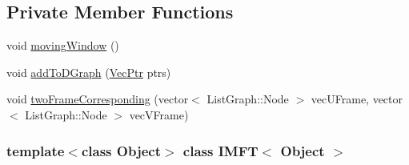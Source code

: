 \subsection*{\-Private \-Member \-Functions}
\begin{DoxyCompactItemize}
\item 
void \hyperlink{class_i_m_f_t_a4afe4b84cad4d3915d888d3da46496f1}{moving\-Window} ()
\item 
void \hyperlink{class_i_m_f_t_aba2080902249baf70c7788e97cf7f6a7}{add\-To\-D\-Graph} (\hyperlink{class_i_m_f_t_a47e5af5b3e023928bd7ddc6ddbf6044c}{\-Vec\-Ptr} ptrs)
\item 
void \hyperlink{class_i_m_f_t_a7f73ff3d638dd056ce848e50f18ec3a9}{two\-Frame\-Corresponding} (vector$<$ \-List\-Graph\-::\-Node $>$ vec\-U\-Frame, vector$<$ \-List\-Graph\-::\-Node $>$ vec\-V\-Frame)
\end{DoxyCompactItemize}
\subsubsection*{template$<$class \-Object$>$ class I\-M\-F\-T$<$ Object $>$}



